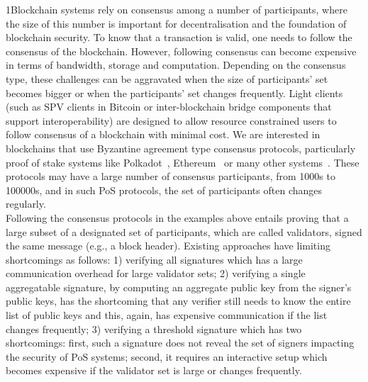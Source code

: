 1Blockchain systems rely on consensus among a number of participants, where the size of this number is important for decentralisation and the foundation of blockchain security. To know that a transaction is valid, one needs to follow the consensus of the blockchain. However, following consensus can become expensive in
terms of bandwidth, storage and computation. Depending on the consensus type, these challenges can be aggravated when the size of participants' set becomes bigger or when the participants' set changes frequently. Light clients (such as SPV clients in Bitcoin \cite{nakamoto2008bitcoin} or inter-blockchain bridge components that support interoperability) are designed to allow resource constrained users to follow consensus of a blockchain with
minimal cost. We are interested in blockchains that use Byzantine agreement type consensus protocols, particularly proof of stake systems
like Polkadot~\cite{polkadot}, Ethereum~\cite{ethereum}
or many other systems~\cite{cosmos,tendermint_paper, celo}. These protocols
may have a large number of consensus participants, from 1000s to 100000s, and in such PoS protocols, the set of participants often changes regularly. \\

\vspace{-0.2cm}
\noindent Following the consensus protocols in the examples above entails proving that a large subset of a designated set of participants,
which are called validators, signed the same message (e.g., a block header). Existing approaches have limiting shortcomings as follows:
1) verifying all signatures which has a large communication overhead for large validator sets;
2) verifying a single aggregatable signature, by computing an aggregate public key from the signer's public keys, has the shortcoming that any verifier still needs to know the entire list of public keys and this, again, has expensive communication if the list changes frequently;
3) verifying a threshold signature which has two shortcomings: first, such a signature does not reveal the set of signers impacting the
security of PoS systems; second, it requires an interactive setup which becomes expensive if the validator set is large or changes frequently.

\vspace{-0.2cm}
